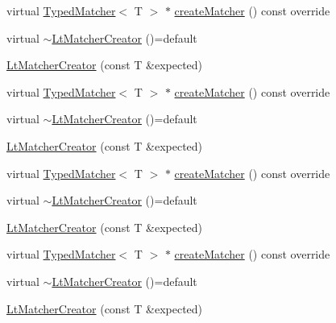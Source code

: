 \begin{DoxyCompactItemize}
virtual \mbox{\hyperlink{structfakeit_1_1TypedMatcher}{Typed\+Matcher}}$<$ T $>$ $\ast$ \mbox{\hyperlink{structfakeit_1_1internal_1_1LtMatcherCreator_a3eb22e77b3c4622fa47160d9bc689c8e}{create\+Matcher}} () const override
\item 
virtual \mbox{\hyperlink{structfakeit_1_1internal_1_1LtMatcherCreator_a6a496de15c15d4a1345baf1d14e17a8f}{$\sim$\+Lt\+Matcher\+Creator}} ()=default
\item 
\mbox{\hyperlink{structfakeit_1_1internal_1_1LtMatcherCreator_ab8164ead0551b2b74d936d590b970392}{Lt\+Matcher\+Creator}} (const T \&expected)
\item 
virtual \mbox{\hyperlink{structfakeit_1_1TypedMatcher}{Typed\+Matcher}}$<$ T $>$ $\ast$ \mbox{\hyperlink{structfakeit_1_1internal_1_1LtMatcherCreator_a3eb22e77b3c4622fa47160d9bc689c8e}{create\+Matcher}} () const override
\item 
virtual \mbox{\hyperlink{structfakeit_1_1internal_1_1LtMatcherCreator_a6a496de15c15d4a1345baf1d14e17a8f}{$\sim$\+Lt\+Matcher\+Creator}} ()=default
\item 
\mbox{\hyperlink{structfakeit_1_1internal_1_1LtMatcherCreator_ab8164ead0551b2b74d936d590b970392}{Lt\+Matcher\+Creator}} (const T \&expected)
\item 
virtual \mbox{\hyperlink{structfakeit_1_1TypedMatcher}{Typed\+Matcher}}$<$ T $>$ $\ast$ \mbox{\hyperlink{structfakeit_1_1internal_1_1LtMatcherCreator_a3eb22e77b3c4622fa47160d9bc689c8e}{create\+Matcher}} () const override
\item 
virtual \mbox{\hyperlink{structfakeit_1_1internal_1_1LtMatcherCreator_a6a496de15c15d4a1345baf1d14e17a8f}{$\sim$\+Lt\+Matcher\+Creator}} ()=default
\item 
\mbox{\hyperlink{structfakeit_1_1internal_1_1LtMatcherCreator_ab8164ead0551b2b74d936d590b970392}{Lt\+Matcher\+Creator}} (const T \&expected)
\item 
virtual \mbox{\hyperlink{structfakeit_1_1TypedMatcher}{Typed\+Matcher}}$<$ T $>$ $\ast$ \mbox{\hyperlink{structfakeit_1_1internal_1_1LtMatcherCreator_a3eb22e77b3c4622fa47160d9bc689c8e}{create\+Matcher}} () const override
\item 
virtual \mbox{\hyperlink{structfakeit_1_1internal_1_1LtMatcherCreator_a6a496de15c15d4a1345baf1d14e17a8f}{$\sim$\+Lt\+Matcher\+Creator}} ()=default
\item 
\mbox{\hyperlink{structfakeit_1_1internal_1_1LtMatcherCreator_ab8164ead0551b2b74d936d590b970392}{Lt\+Matcher\+Creator}} (const T \&expected)
\item 

\end{DoxyCompactItemize}
